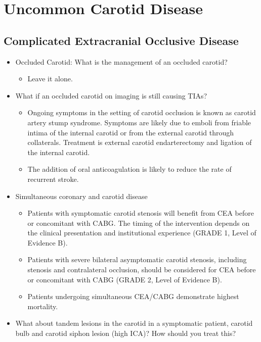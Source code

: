 \documentclass[
]{book}
\providecommand{\tightlist}{%
  \setlength{\itemsep}{0pt}\setlength{\parskip}{0pt}}
\begin{document}
\hypertarget{uncommon-carotid-disease}{%
\section{Uncommon Carotid Disease}\label{uncommon-carotid-disease}}

\hypertarget{complicated-extracranial-occlusive-disease}{%
\subsection{Complicated Extracranial Occlusive Disease}\label{complicated-extracranial-occlusive-disease}}

\begin{itemize}
\item
  Occluded Carotid: What is the management of an occluded carotid?

  \begin{itemize}
  \tightlist
  \item
    Leave it alone.
  \end{itemize}
\item
  What if an occluded carotid on imaging is still causing TIAs?

  \begin{itemize}
  \item
    Ongoing symptoms in the setting of carotid occlusion is known as
    carotid artery stump syndrome. Symptoms are likely due to emboli
    from friable intima of the internal carotid or from the external
    carotid through collaterals. Treatment is external carotid
    endarterectomy and ligation of the internal carotid.\citep{hrbác2012}
  \item
    The addition of oral anticoagulation is likely to reduce the
    rate of recurrent stroke.
  \end{itemize}
\item
  Simultaneous coronary and carotid disease

  \begin{itemize}
  \item
    Patients with symptomatic carotid stenosis will benefit from CEA
    before or concomitant with CABG. The timing of the intervention
    depends on the clinical presentation and institutional
    experience (GRADE 1, Level of Evidence B).
  \item
    Patients with severe bilateral asymptomatic carotid stenosis,
    including stenosis and contralateral occlusion, should be
    considered for CEA before or concomitant with CABG (GRADE 2,
    Level of Evidence B).
  \item
    Patients undergoing simultaneous CEA/CABG demonstrate highest
    mortality. \citep{naylorSystematicReviewOutcomes2003}
  \end{itemize}
\item
  What about tandem lesions in the carotid in a symptomatic patient,
  carotid bulb and carotid siphon lesion (high ICA)? How should you
  treat this?


\end{itemize}
\end{document}

